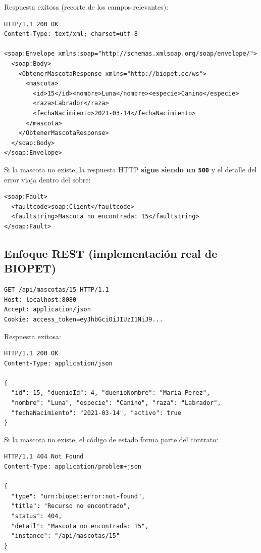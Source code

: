 Respuesta exitosa (recorte de los campos relevantes):

\begin{verbatim}
HTTP/1.1 200 OK
Content-Type: text/xml; charset=utf-8

<soap:Envelope xmlns:soap="http://schemas.xmlsoap.org/soap/envelope/">
  <soap:Body>
    <ObtenerMascotaResponse xmlns="http://biopet.ec/ws">
      <mascota>
        <id>15</id><nombre>Luna</nombre><especie>Canino</especie>
        <raza>Labrador</raza>
        <fechaNacimiento>2021-03-14</fechaNacimiento>
      </mascota>
    </ObtenerMascotaResponse>
  </soap:Body>
</soap:Envelope>
\end{verbatim}

Si la mascota no existe, la respuesta HTTP \textbf{sigue siendo un
\texttt{500}} y el detalle del error viaja dentro del sobre:

\begin{verbatim}
<soap:Fault>
  <faultcode>soap:Client</faultcode>
  <faultstring>Mascota no encontrada: 15</faultstring>
</soap:Fault>
\end{verbatim}

\subsection{Enfoque REST (implementaci\'on real de BIOPET)}

\begin{verbatim}
GET /api/mascotas/15 HTTP/1.1
Host: localhost:8080
Accept: application/json
Cookie: access_token=eyJhbGciOiJIUzI1NiJ9...
\end{verbatim}

Respuesta exitosa:

\begin{verbatim}
HTTP/1.1 200 OK
Content-Type: application/json

{
  "id": 15, "duenioId": 4, "duenioNombre": "Maria Perez",
  "nombre": "Luna", "especie": "Canino", "raza": "Labrador",
  "fechaNacimiento": "2021-03-14", "activo": true
}
\end{verbatim}

Si la mascota no existe, el c\'odigo de estado forma parte del contrato:

\begin{verbatim}
HTTP/1.1 404 Not Found
Content-Type: application/problem+json

{
  "type": "urn:biopet:error:not-found",
  "title": "Recurso no encontrado",
  "status": 404,
  "detail": "Mascota no encontrada: 15",
  "instance": "/api/mascotas/15"
}
\end{verbatim}

